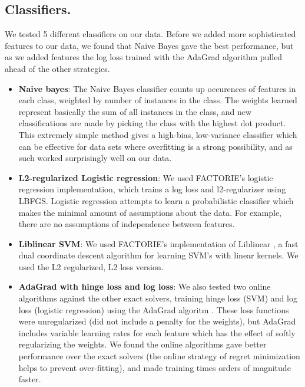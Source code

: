 \documentclass[11pt]{article}
\begin{document}
\subsection*{Classifiers.}We tested 5 different classifiers on our data. Before we added more sophisticated features to our data, we found that Naive Bayes gave the best performance, but as we added features the log loss trained with the AdaGrad algorithm pulled ahead of the other strategies.
 \begin{itemize}
\item \textbf{Naive bayes}: The Naive Bayes classifier counts up occurences of features in each class, weighted by number of instances in the class. The weights learned represent basically the sum of all instances in the class, and new classifications are made by picking the class with the highest dot product. This extremely simple method gives a high-bias, low-variance classifier which can be effective for data sets where overfitting is a strong possibility, and as such worked surprisingly well on our data. 
\item \textbf{L2-regularized Logistic regression}: We used FACTORIE's logistic regression implementation, which trains a log loss and l2-regularizer using LBFGS. Logistic regression attempts to learn a probabilistic classifier which makes the minimal amount of assumptions about the data. For example, there are no assumptions of independence between features. 
\item \textbf{Liblinear SVM}: We used FACTORIE's implementation of Liblinear \cite{chang:08a}, a fast dual coordinate descent algorithm for learning SVM's with linear kernels. We used the L2 regularized, L2 loss version.
\item \textbf{AdaGrad with hinge loss and log loss}: We also tested two online algorithms against the other exact solvers, training hinge loss (SVM) and log loss (logistic regression) using the AdaGrad algoritm \cite{duchi:11a}. These loss functions were unregularized (did not include a penalty for the weights), but AdaGrad includes variable learning rates for each feature which has the effect of softly regularizing the weights. We found the online algorithms gave better performance over the exact solvers (the online strategy of regret minimization helps to prevent over-fitting), and made training times orders of magnitude faster.
\end{itemize}
\end{document}
